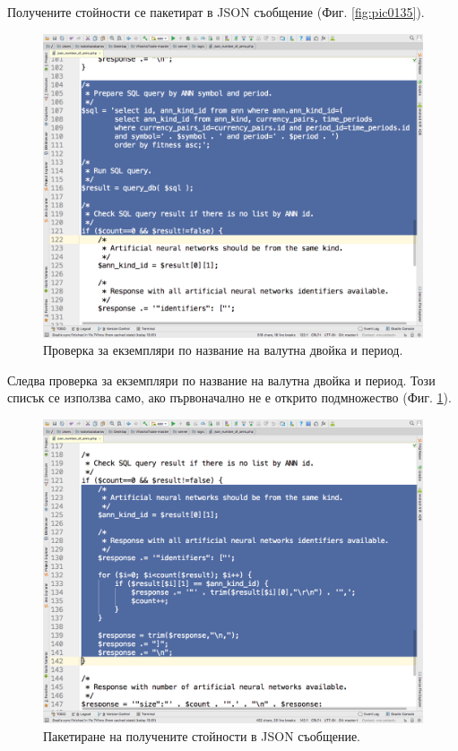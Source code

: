 \documentclass[book,14pt,oneside,openany]{memoir}
\begin{document}
Получените стойности се пакетират в JSON съобщение (Фиг. \ref{fig:pic0135}). 

\begin{figure}[h]
  \centering
  \includegraphics[height=0.45\pdfpageheight]{pic0136}
  \caption{Проверка за екземпляри по название на валутна двойка и период.}
\label{fig:pic0136}
\end{figure}
\FloatBarrier

Следва проверка за екземпляри по название на валутна двойка и период. Този списък се използва само, ако първоначално не е открито подмножество (Фиг. \ref{fig:pic0136}).

\begin{figure}[h]
  \centering
  \includegraphics[height=0.45\pdfpageheight]{pic0137}
  \caption{Пакетиране на получените стойности в JSON съобщение.}
\label{fig:pic0137}
\end{figure}
\FloatBarrier
\end{document}
